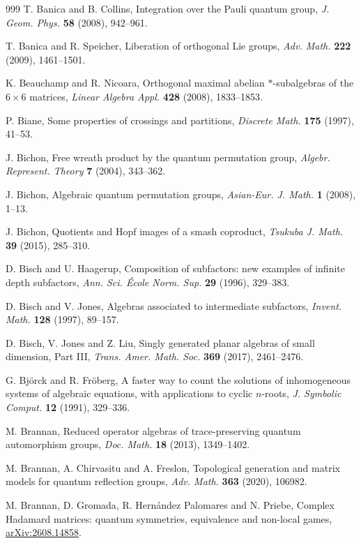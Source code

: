\documentclass[11pt]{amsart}
\newcommand{\arx}[1]{{\hypersetup{allcolors=black}\href{https://arxiv.org/pdf/#1}{arXiv:#1}}}
\begin{document}
\begin{thebibliography}{999}
 T. Banica and B. Collins, Integration over the Pauli quantum group, {\em J. Geom. Phys.} {\bf 58} (2008), 942--961.

 T. Banica and R. Speicher, Liberation of orthogonal Lie groups, {\em Adv. Math.} {\bf 222} (2009), 1461--1501.

 K. Beauchamp and R. Nicoara, Orthogonal maximal abelian $*$-subalgebras of the $6\times 6$ matrices, {\em Linear Algebra Appl.} {\bf 428} (2008), 1833--1853.

 P. Biane, Some properties of crossings and partitions, {\em Discrete Math.} {\bf 175} (1997), 41--53.

 J. Bichon, Free wreath product by the quantum permutation group, {\em Algebr. Represent. Theory} {\bf 7} (2004), 343--362.

 J. Bichon, Algebraic quantum permutation groups, {\em Asian-Eur. J. Math.} {\bf 1} (2008), 1--13.

 J. Bichon, Quotients and Hopf images of a smash coproduct, {\em Tsukuba J. Math.} {\bf 39} (2015), 285--310.

 D. Bisch and U. Haagerup, Composition of subfactors: new examples of infinite depth subfactors, {\em Ann. Sci. \'Ecole Norm. Sup.} {\bf 29} (1996), 329--383.

 D. Bisch and V. Jones, Algebras associated to intermediate subfactors, {\em Invent. Math.} {\bf 128} (1997), 89--157.

 D. Bisch, V. Jones and Z. Liu, Singly generated planar algebras of small dimension, Part III, {\em Trans. Amer. Math. Soc.} {\bf 369} (2017), 2461--2476.

 G. Bj\"orck and R. Fr\"oberg, A faster way to count the solutions of inhomogeneous systems of algebraic equations, with applications to cyclic $n$-roots, {\em J. Symbolic Comput.} {\bf 12} (1991), 329--336.

 M. Brannan, Reduced operator algebras of trace-preserving quantum automorphism groups, {\em Doc. Math.} {\bf 18} (2013), 1349--1402.

 M. Brannan, A. Chirvasitu and A. Freslon, Topological generation and matrix models for quantum reflection groups, {\em Adv. Math.} {\bf 363} (2020), 106982.

 M. Brannan, D. Gromada, R. Hern\'andez Palomares and N. Priebe, Complex Hadamard matrices: quantum symmetries, equivalence and non-local games, \arx{2608.14858}.


\end{thebibliography}
\end{document}
